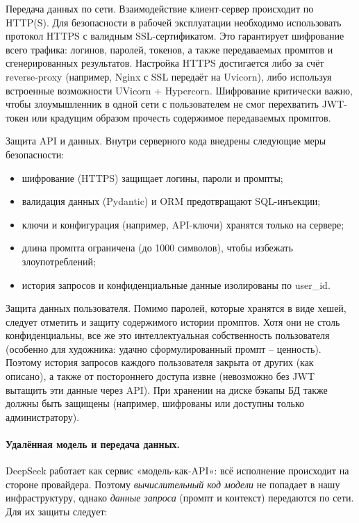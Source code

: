 Передача данных по сети. Взаимодействие клиент-сервер происходит по HTTP(S). Для безопасности в рабочей эксплуатации необходимо использовать протокол HTTPS с валидным SSL-сертификатом. Это гарантирует шифрование всего трафика: логинов, паролей, токенов, а также передаваемых промптов и сгенерированных результатов. Настройка HTTPS достигается либо за счёт reverse-proxy (например, Nginx с SSL передаёт на Uvicorn), либо используя встроенные возможности UVicorn + Hypercorn. Шифрование критически важно, чтобы злоумышленник в одной сети с пользователем не смог перехватить JWT-токен или крадущим образом прочесть содержимое передаваемых промптов.

Защита API и данных. Внутри серверного кода внедрены следующие меры безопасности:
\begin{itemize}
    \item шифрование (HTTPS) защищает логины, пароли и промпты;
    \item валидация данных (Pydantic) и ORM предотвращают SQL-инъекции;
    \item ключи и конфигурация (например, API-ключи) хранятся только на сервере;
    \item длина промпта ограничена (до 1000 символов), чтобы избежать злоупотреблений;
    \item история запросов и конфиденциальные данные изолированы по user\_id.
\end{itemize}

Защита данных пользователя. Помимо паролей, которые хранятся в виде хешей, следует отметить и защиту содержимого истории промптов. Хотя они не столь конфиденциальны, все же это интеллектуальная собственность пользователя (особенно для художника: удачно сформулированный промпт – ценность). Поэтому история запросов каждого пользователя закрыта от других (как описано), а также от постороннего доступа извне (невозможно без JWT вытащить эти данные через API). При хранении на диске бэкапы БД также должны быть защищены (например, шифрованы или доступны только администратору).

\paragraph{Удалённая модель и передача данных.}
DeepSeek работает как сервис «модель-как-API»: всё исполнение происходит на стороне провайдера.
Поэтому \emph{вычислительный код модели} не попадает в нашу инфраструктуру, однако
\emph{данные запроса} (промпт и контекст) передаются по сети.  
Для их защиты следует:

